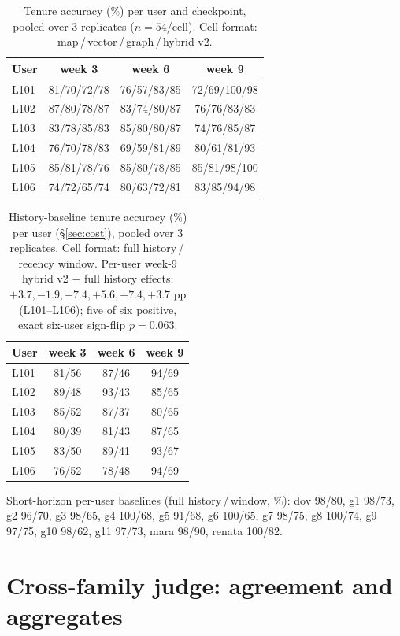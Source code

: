 \begin{table}[h]
\centering
\small
\caption{Tenure accuracy (\%) per user and checkpoint, pooled over 3 replicates
($n{=}54$/cell). Cell format: map\,/\,vector\,/\,graph\,/\,hybrid v2.}
\label{tab:tenureuser}
\begin{tabular}{lccc}
\toprule
User & week 3 & week 6 & week 9 \\
\midrule
L101 & 81/70/72/78 & 76/57/83/85 & 72/69/100/98 \\
L102 & 87/80/78/87 & 83/74/80/87 & 76/76/83/83 \\
L103 & 83/78/85/83 & 85/80/80/87 & 74/76/85/87 \\
L104 & 76/70/78/83 & 69/59/81/89 & 80/61/81/93 \\
L105 & 85/81/78/76 & 85/80/78/85 & 85/81/98/100 \\
L106 & 74/72/65/74 & 80/63/72/81 & 83/85/94/98 \\
\bottomrule
\end{tabular}
\end{table}

\begin{table}[h]
\centering
\small
\caption{History-baseline tenure accuracy (\%) per user (\S\ref{sec:cost}),
pooled over 3 replicates. Cell format: full history\,/\,recency window.
Per-user week-9 hybrid v2 $-$ full history effects: $+3.7, -1.9, +7.4,
+5.6, +7.4, +3.7$ pp (L101--L106); five of six positive, exact six-user
sign-flip $p=0.063$.}
\label{tab:baselineuser}
\begin{tabular}{lccc}
\toprule
User & week 3 & week 6 & week 9 \\
\midrule
L101 & 81/56 & 87/46 & 94/69 \\
L102 & 89/48 & 93/43 & 85/65 \\
L103 & 85/52 & 87/37 & 80/65 \\
L104 & 80/39 & 81/43 & 87/65 \\
L105 & 83/50 & 89/41 & 93/67 \\
L106 & 76/52 & 78/48 & 94/69 \\
\bottomrule
\end{tabular}
\end{table}

Short-horizon per-user baselines (full history\,/\,window, \%): dov 98/80,
g1 98/73, g2 96/70, g3 98/65, g4 100/68, g5 91/68, g6 100/65, g7 98/75,
g8 100/74, g9 97/75, g10 98/62, g11 97/73, mara 98/90, renata 100/82.

\section{Cross-family judge: agreement and aggregates}
\label{app:crossjudge}

